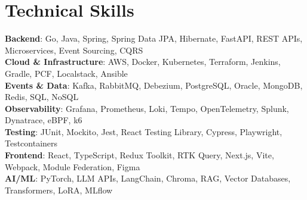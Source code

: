\documentclass[letterpaper,11pt]{article}
\begin{document}
\section{Technical Skills}
\vspace{-7pt}
\begin{itemize}
[leftmargin=0.15in, label={}]\small{\item{
    \textbf{Backend}{: Go, Java, Spring, Spring Data JPA, Hibernate, FastAPI, REST APIs, Microservices, Event Sourcing, CQRS} \\
    \textbf{Cloud \& Infrastructure}{: AWS, Docker, Kubernetes, Terraform, Jenkins, Gradle, PCF, Localstack, Ansible} \\
    \textbf{Events \& Data}{: Kafka, RabbitMQ, Debezium, PostgreSQL, Oracle, MongoDB, Redis, SQL, NoSQL} \\
    \textbf{Observability}{: Grafana, Prometheus, Loki, Tempo, OpenTelemetry, Splunk, Dynatrace, eBPF, k6} \\
    \textbf{Testing}{: JUnit, Mockito, Jest, React Testing Library, Cypress, Playwright, Testcontainers} \\
    \textbf{Frontend}{: React, TypeScript, Redux Toolkit, RTK Query, Next.js, Vite, Webpack, Module Federation, Figma} \\
    \textbf{AI/ML}{: PyTorch, LLM APIs, LangChain, Chroma, RAG, Vector Databases, Transformers, LoRA, MLflow}
}}
\end{itemize}
\end{document}

